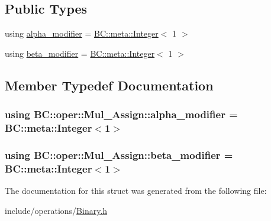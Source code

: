 \subsection*{Public Types}
\begin{DoxyCompactItemize}
\item 
using \hyperlink{structBC_1_1oper_1_1Mul__Assign_a719ad0945432bfc68c6addca68ce7b06}{alpha\+\_\+modifier} = \hyperlink{structBC_1_1meta_1_1Integer}{B\+C\+::meta\+::\+Integer}$<$ 1 $>$
\item 
using \hyperlink{structBC_1_1oper_1_1Mul__Assign_a29e049ecf3a5a47cdb047a2c3b4e6963}{beta\+\_\+modifier} = \hyperlink{structBC_1_1meta_1_1Integer}{B\+C\+::meta\+::\+Integer}$<$ 1 $>$
\end{DoxyCompactItemize}


\subsection{Member Typedef Documentation}
\subsubsection[{\texorpdfstring{alpha\+\_\+modifier}{alpha_modifier}}]{\setlength{\rightskip}{0pt plus 5cm}using {\bf B\+C\+::oper\+::\+Mul\+\_\+\+Assign\+::alpha\+\_\+modifier} =  {\bf B\+C\+::meta\+::\+Integer}$<$1$>$}\hypertarget{structBC_1_1oper_1_1Mul__Assign_a719ad0945432bfc68c6addca68ce7b06}{}\label{structBC_1_1oper_1_1Mul__Assign_a719ad0945432bfc68c6addca68ce7b06}
\subsubsection[{\texorpdfstring{beta\+\_\+modifier}{beta_modifier}}]{\setlength{\rightskip}{0pt plus 5cm}using {\bf B\+C\+::oper\+::\+Mul\+\_\+\+Assign\+::beta\+\_\+modifier} =  {\bf B\+C\+::meta\+::\+Integer}$<$1$>$}\hypertarget{structBC_1_1oper_1_1Mul__Assign_a29e049ecf3a5a47cdb047a2c3b4e6963}{}\label{structBC_1_1oper_1_1Mul__Assign_a29e049ecf3a5a47cdb047a2c3b4e6963}


The documentation for this struct was generated from the following file\+:\begin{DoxyCompactItemize}
\item 
include/operations/\hyperlink{Binary_8h}{Binary.\+h}\end{DoxyCompactItemize}
